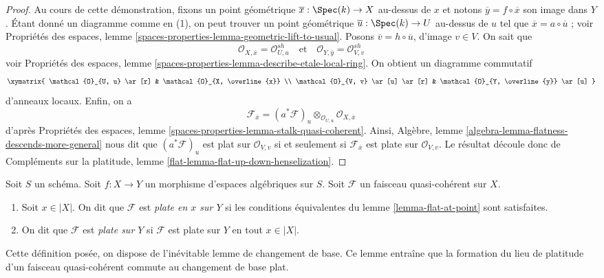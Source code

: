 \begin{proof}
Au cours de cette démonstration, fixons un point géométrique
$\overline{x} : \Spec(k) \to X$ au-dessus de $x$ et
notons $\overline{y} = f \circ \overline{x}$ son image dans $Y$.
Étant donné un diagramme comme en (1), on peut trouver un point géométrique
$\overline{u} : \Spec(k) \to U$ au-dessus de $u$ tel que
$\overline{x} = a \circ \overline{u}$ ; voir
Propriétés des espaces, lemme
\ref{spaces-properties-lemma-geometric-lift-to-usual}.
Posons $\overline{v} = h \circ \overline{u}$, d'image $v \in V$.
On sait que
$$
\mathcal{O}_{X, \overline{x}} = \mathcal{O}_{U, u}^{sh}
\quad\text{et}\quad
\mathcal{O}_{Y, \overline{y}} = \mathcal{O}_{V, v}^{sh}
$$
voir
Propriétés des espaces, lemme
\ref{spaces-properties-lemma-describe-etale-local-ring}.
On obtient un diagramme commutatif
$$
\xymatrix{
\mathcal{O}_{U, u} \ar[r] &
\mathcal{O}_{X, \overline{x}} \\
\mathcal{O}_{V, v} \ar[u] \ar[r] &
\mathcal{O}_{Y, \overline{y}} \ar[u]
}
$$
d'anneaux locaux. Enfin, on a
$$
\mathcal{F}_{\overline{x}} =
(a^*\mathcal{F})_u \otimes_{\mathcal{O}_{U, u}}
\mathcal{O}_{X, \overline{x}}
$$
d'après
Propriétés des espaces, lemme \ref{spaces-properties-lemma-stalk-quasi-coherent}.
Ainsi,
Algèbre, lemme \ref{algebra-lemma-flatness-descends-more-general}
nous dit que $(a^*\mathcal{F})_u$ est plat sur $\mathcal{O}_{V, v}$
si et seulement si $\mathcal{F}_{\overline{x}}$ est plate sur $\mathcal{O}_{V, v}$.
Le résultat découle donc de
Compléments sur la platitude, lemme \ref{flat-lemma-flat-up-down-henselization}.
\end{proof}

\begin{definition}
\label{definition-flat-module}
Soit $S$ un schéma.
Soit $f : X \to Y$ un morphisme d'espaces algébriques sur $S$.
Soit $\mathcal{F}$ un faisceau quasi-cohérent sur $X$.
\begin{enumerate}
\item Soit $x \in |X|$. On dit que $\mathcal{F}$ est {\it plate en $x$ sur $Y$}
si les conditions équivalentes du
lemme \ref{lemma-flat-at-point}
sont satisfaites.
\item On dit que $\mathcal{F}$ est {\it plate sur $Y$} si $\mathcal{F}$ est
plate sur $Y$ en tout $x \in |X|$.
\end{enumerate}
\end{definition}

\noindent
Cette définition posée, on dispose de l'inévitable lemme de changement de base.
Ce lemme entraîne que la formation du lieu de platitude d'un faisceau
quasi-cohérent commute au changement de base plat.

